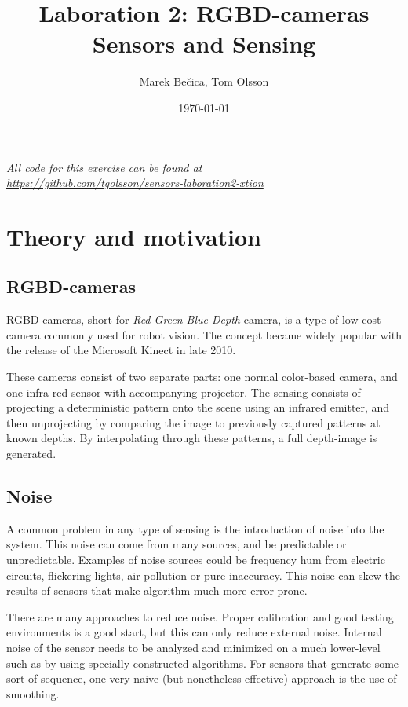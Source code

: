 \documentclass[11pt]{article}
\title{Laboration 2: RGBD-cameras\\ {\small Sensors and Sensing}}
\author{Marek Bečica, Tom Olsson}
\date{\today}
\begin{document}
\maketitle %
\begin{center}
  \emph{All code for this exercise can be found at \\ \url{https://github.com/tgolsson/sensors-laboration2-xtion}}
\end{center}
\tableofcontents
\lstlistoflistings %
\listoffigures %
\listoftables
\lstset{ matchrangestart=t} %
\section{Theory and motivation}
\subsection{RGBD-cameras}
RGBD-cameras, short for \emph{Red-Green-Blue-Depth}-camera, is a type of low-cost camera commonly used for robot vision. The concept became widely popular with the release of the Microsoft Kinect in late 2010. \par

These cameras consist of two separate parts: one normal color-based camera, and one infra-red sensor with accompanying projector. The sensing consists of projecting a deterministic pattern onto the scene using an infrared emitter, and then unprojecting by comparing the image to previously captured patterns at known depths. By interpolating through these patterns, a full depth-image is generated.  
\subsection{Noise}

A common problem in any type of sensing is the introduction of noise into the system. This noise can come from many sources, and be predictable or unpredictable. Examples of noise sources could be frequency hum from electric circuits, flickering lights, air pollution or pure inaccuracy. This noise can skew the results of sensors that make algorithm much more error prone. \par

There are many approaches to reduce noise. Proper calibration and good testing environments is a good start, but this can only reduce external noise. Internal noise of the sensor needs to be analyzed and minimized on a much lower-level such as by using specially constructed algorithms. For sensors that generate some sort of sequence, one very naive (but nonetheless effective) approach is the use of smoothing. \par
\end{document}
